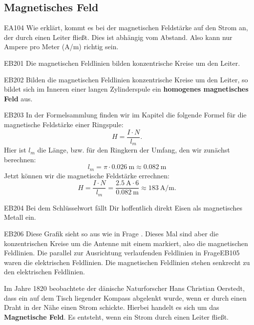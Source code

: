 \subsection{Magnetisches Feld}
\begin{sol}{EA104}
  Wie erklärt, kommt es bei der magnetischen Feldstärke auf den Strom an, der durch einen Leiter fließt. Dies ist abhängig vom Abstand.
  Also kann nur Ampere pro Meter (A/m) richtig sein.   
\end{sol}
\begin{sol}{EB201}
  Die magnetischen Feldlinien bilden konzentrische Kreise um den Leiter.
\end{sol}

\begin{sol}{EB202}
Bilden die magnetischen Feldlinien konzentrische Kreise um den Leiter, so bildet sich im Inneren einer langen Zylinderspule ein \textbf{homogenes magnetisches Feld} aus.
\end{sol}

\begin{sol}{EB203}
  In der Formelsammlung finden wir im Kapitel  die folgende Formel 
  für die magnetische Feldstärke einer Ringspule:
  $$H = \frac{I\cdot N}{l_m}.$$
Hier ist $l_m$ die Länge, bzw. für den Ringkern der Umfang, den wir zunächst berechnen:
$$l_m = \pi \cdot \SI{0.026}{\meter} \approx \SI{0.082}{\meter}$$  
Jetzt können wir die magnetische Feldstärke errechnen:
$$H = \frac{I\cdot N}{l_m} = \frac{\SI{2.5}{\ampere} \cdot 6}{\SI{0.082}{\meter}} \approx \SI{183}{\ampere\per\meter}. $$

\end{sol}

\begin{sol}{EB204}
  Bei dem Schlüsselwort  fällt Dir hoffentlich direkt Eisen als magnetisches Metall ein.
\end{sol}
  
\begin{sol}{EB206}
  Diese Grafik sieht so aus wie in Frage . Dieses Mal sind aber die konzentrischen Kreise um die Antenne mit einem  markiert, also die magnetischen Feldlinien. Die parallel zur Ausrichtung verlaufenden Feldlinien in Frage{EB105} waren die elektrischen Feldlinien. Die magnetischen Feldlinien stehen senkrecht zu den elektrischen Feldlinien. 
\end{sol}

\begin{ohmchapter}
  Im Jahre 1820 beobachtete der dänische Naturforscher Hans Christian Oerstedt, dass ein auf dem Tisch liegender Kompass abgelenkt wurde, wenn er durch einen Draht in der Nähe einen Strom schickte. Hierbei handelt es sich um das \textbf{Magnetische Feld}. Es entsteht, wenn ein Strom durch einen Leiter fließt.
\end{ohmchapter}   


